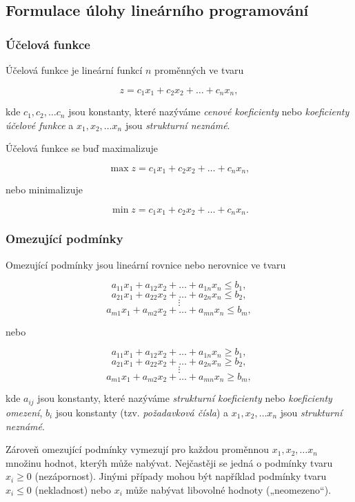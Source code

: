\subsection{Formulace úlohy lineárního programování}

\subsubsection{Účelová funkce}


Účelová funkce je lineární funkcí $n$ proměnných ve tvaru

$$ z = c_1x_1 + c_2x_2 + \ldots + c_nx_n , $$


kde $c_1, c_2, \ldots c_n$ jsou konstanty, které nazýváme \textit{cenové koeficienty} nebo \textit{koeficienty účelové funkce} a 
$x_1, x_2, \ldots x_n$ jsou \textit{strukturní neznámé}.

Účelová funkce se buď maximalizuje

$$ \max z = c_1x_1 + c_2x_2 + \ldots + c_nx_n ,$$

nebo minimalizuje

$$ \min z = c_1x_1 + c_2x_2 + \ldots + c_nx_n .$$

\subsubsection{Omezující podmínky}

Omezující podmínky jsou lineární rovnice nebo nerovnice ve tvaru

$$ a_{11}x_1 + a_{12}x_2 + \ldots + a_{1n}x_n \leq b_1 ,$$
$$ a_{21}x_1 + a_{22}x_2 + \ldots + a_{2n}x_n \leq b_2 ,$$
$$ \vdots $$
$$ a_{m1}x_1 + a_{m2}x_2 + \ldots + a_{mn}x_n \leq b_m ,$$

nebo

$$ a_{11}x_1 + a_{12}x_2 + \ldots + a_{1n}x_n \geq b_1 ,$$
$$ a_{21}x_1 + a_{22}x_2 + \ldots + a_{2n}x_n \geq b_2 ,$$
$$ \vdots $$
$$ a_{m1}x_1 + a_{m2}x_2 + \ldots + a_{mn}x_n \geq b_m ,$$

kde $a_{ij}$ jsou konstanty, které nazýváme \textit{strukturní koeficienty} nebo \textit{koeficienty omezení}, $b_i$ jsou konstanty (tzv. \textit{požadavková čísla})
a $x_1, x_2, \ldots x_n$ jsou \textit{strukturní neznámé}.

Zároveň omezující podmínky vymezují pro každou proměnnou $x_1, x_2, \ldots x_n$ množinu hodnot, kterýh může nabývat. 
Nejčastěji se jedná o podmínky tvaru $x_i \geq 0$ (nezápornost).
Jinými případy mohou být například podmínky tvaru $x_i \leq 0$ (nekladnost) nebo $x_i$ může nabývat libovolné hodnoty („neomezeno“).

